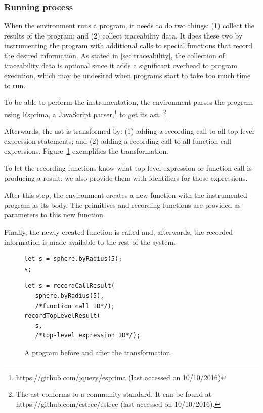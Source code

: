 \subsubsection{Running process}
When the environment runs a program, it needs to do two things: (1) collect the results of the program; and (2) collect traceability data.
It does these two by instrumenting the program with additional calls to special functions that record the desired information.
As stated in \ref{sec:traceability}, the collection of traceability data is optional since it adds a significant overhead to program execution, which may be undesired when programs start to take too much time to run.

To be able to perform the instrumentation, the environment parses the program using Esprima, a JavaScript parser,\footnote{https://github.com/jquery/esprima (last accessed on 10/10/2016)} to get its \gls{ast}.%
\footnote{The \gls{ast} conforms to a community standard. It can be found at https://github.com/estree/estree (last accessed on 10/10/2016).}

Afterwards, the \gls{ast} is transformed by: (1) adding a recording call to all top-level expression statements; and (2) adding a recording call to all function call expressions.
Figure~\ref{fig:instrument:example} exemplifies the transformation.

To let the recording functions know what top-level expression or function call is producing a result, we also provide them with identifiers for those expressions.

After this step, the environment creates a new function with the instrumented program as its body.
The primitives and recording functions are provided as parameters to this new function.

Finally, the newly created function is called and, afterwards, the recorded information is made available to the rest of the system.

\begin{figure}
  \centering
\begin{minipage}[t]{0.45\linewidth}
  \begin{verbatim}
let s = sphere.byRadius(5);
s;
  \end{verbatim}
\end{minipage}
\hspace{0.05\linewidth}
\begin{minipage}[t]{0.45\linewidth}
  \begin{verbatim}
let s = recordCallResult(
   sphere.byRadius(5),
   /*function call ID*/);
recordTopLevelResult(
   s,
   /*top-level expression ID*/);
  \end{verbatim}
\end{minipage}
  \caption{A program before and after the transformation.}
  \label{fig:instrument:example}
\end{figure}


